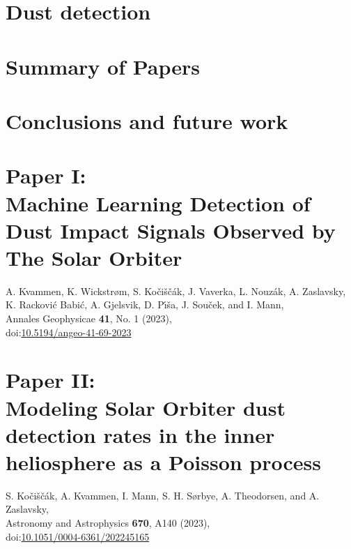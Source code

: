 \documentclass[11pt,twoside,openright]{book}
\begin{document}
\chapter{Dust detection}\label{ch:detection}


\chapter{Summary of Papers}\label{ch:sum-paper}


\chapter{Conclusions and future work}\label{ch:conclusion}





\backmatter


%
\printbibliography[heading=bibintoc,title={Bibliography},env=bibnumeric]




\chapter{Paper I: \\ Machine Learning Detection of Dust Impact Signals Observed by The Solar Orbiter}
A. Kvammen, K. Wickstr{\o}m, S. Ko{\v{c}}i{\v{s}}{\v{c}}{\'a}k, J. Vaverka, L. Nouz{\'a}k, A. Zaslavsky, K. Rackovi{\'c} Babi{\'c}, A. Gjelsvik, D. P{\'\i}{\v{s}}a, J. Sou{\v{c}}ek, and I. Mann, \\
Annales Geophysicae {\bf 41}, No. 1 (2023),\\
doi:\href{https://doi.org/10.5194/angeo-41-69-2023}{10.5194/angeo-41-69-2023}
\newpage\null\newpage


\chapter{Paper II: \\ Modeling Solar Orbiter dust detection rates in the inner heliosphere as a Poisson process}
S. Ko{\v{c}}i{\v{s}}{\v{c}}{\'a}k, A. Kvammen, I. Mann, S. H. S{\o}rbye, A. Theodorsen, and A. Zaslavsky,\\
Astronomy and Astrophysics {\bf 670}, A140 (2023),\\
doi:\href{https://doi.org/10.1051/0004-6361/202245165}{10.1051/0004-6361/202245165}
\newpage\null\newpage

\end{document}
